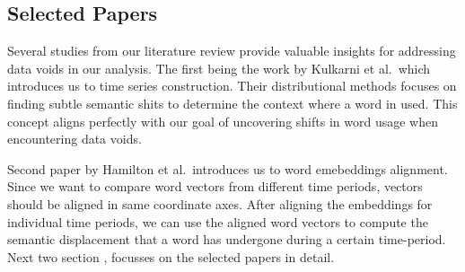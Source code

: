 \subsection{Selected Papers}\label{subsec:selected-papers}
Several studies from our literature review provide valuable insights for addressing data voids in our analysis.
The first being the work by Kulkarni et al.\ which introduces us to time series construction.
Their distributional methods focuses on finding subtle semantic shits to determine the context where a word in used.
This concept aligns perfectly with our goal of uncovering shifts in word usage when encountering data voids.

Second paper by Hamilton et al.\ introduces us to word emebeddings alignment.
Since we want to compare word vectors from different time periods, vectors should be aligned in same coordinate axes.
After aligning the embeddings for individual time periods, we can use the aligned word vectors to compute the semantic displacement that a word has undergone during a certain time-period.
Next two section ,  focusses on the selected papers in detail.